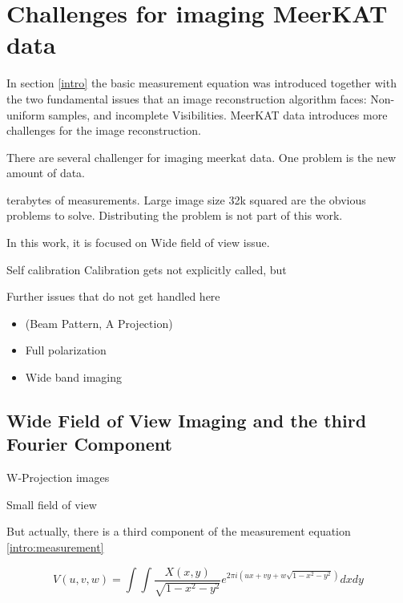 \section{Challenges for imaging MeerKAT data} \label{meerkat}
In section \ref{intro} the basic measurement equation was introduced together with the two fundamental issues that an image reconstruction algorithm faces: Non-uniform samples, and incomplete Visibilities. MeerKAT data introduces more challenges for the image reconstruction. 


There are several challenger for imaging meerkat data. One problem is the new amount of data.

terabytes of measurements. Large image size 32k squared are the obvious problems to solve. Distributing the problem is not part of this work.

 In this work, it is focused on Wide field of view issue. 


Self calibration Calibration gets not explicitly called, but 

Further issues that do not get handled here
\begin{itemize}
	\item (Beam Pattern, A Projection)
	\item Full polarization
	\item Wide band imaging
\end{itemize}



\subsection{Wide Field of View Imaging and the third Fourier Component} \label{wof}
W-Projection images 

Small field of view


But actually, there is a third component of the measurement equation \eqref{intro:measurement}

\begin{equation}\label{meerkat:ftsphere}
V(u, v, w) = \int\int \frac{X(x, y)}{\sqrt{1 - x^2 - y ^2}} e^{2 \pi i (ux+vy+ w\sqrt{1 - x^2 - y ^2})}dx dy
\end{equation}


